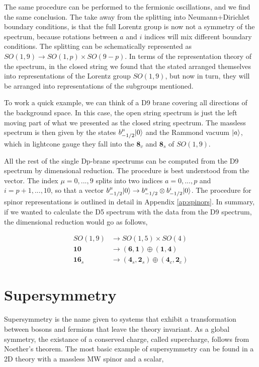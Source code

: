 The same procedure can be performed to the fermionic oscillations, and we find the same conclusion. The take away from the splitting into Neumann+Dirichlet boundary conditions, is that the full Lorentz group is now not a symmetry of the spectrum, because rotations between $a$ and $i$ indices will mix different boundary conditions. The splitting can be schematically represented as $SO(1,9) \rightarrow SO(1,p) \times SO(9-p)$. In terms of the representation theory of the spectrum, in the closed string we found that the stated arranged themselves into representations of the Lorentz group $SO(1,9)$, but now in turn, they will be arranged into representations of the subgroups mentioned.

To work a quick example, we can think of a D9 brane covering all directions of the background space. In this case, the open string spectrum is just the left moving part of what we presented as the closed string spectrum. The massless spectrum is then given by the states $b_{-1/2}^\mu \lvert0\rangle$ and the Rammond vacuum $\lvert a\rangle$, which in lightcone gauge they fall into the $\mathbf{8}_v$ and $\mathbf{8}_s$ of $SO(1,9)$.

All the rest of the single Dp-brane spectrums can be computed from the D9 spectrum by dimensional reduction. The procedure is best understood from the vector. The index $\mu = 0,...,9$ splits into two indices $a = 0,...,p$ and $i = p+1,...,10$, so that a vector $b_{-1/2}^\mu \lvert0\rangle \rightarrow b_{-1/2}^a \otimes b_{-1/2}^i \lvert0\rangle$. The procedure for spinor representations is outlined in detail in Appendix \ref{ap:spinors}. In summary, if we wanted to calculate the D5 spectrum with the data from the D9 spectrum, the dimensional reduction would go as follows,

\begin{align*}
    SO(1,9) &\rightarrow SO(1,5) \times SO(4) \\
    \mathbf{10} &\rightarrow (\mathbf{6},\mathbf{1}) \oplus (\mathbf{1}, \mathbf{4}) \\
    \mathbf{16}_s &\rightarrow (\mathbf{4}_s, \mathbf{2}_s) \oplus (\mathbf{4}_c, \mathbf{2}_c)
\end{align*}

\section{Supersymmetry}
\label{sec:susy}

Supersymmetry is the name given to systems that exhibit a transformation between bosons and fermions that leave the theory invariant. As a global symmetry, the existance of a conserved charge, called supercharge, follows from Noether's theorem. The most basic example of supersymmetry can be found in a 2D theory with a massless MW spinor and a scalar,

